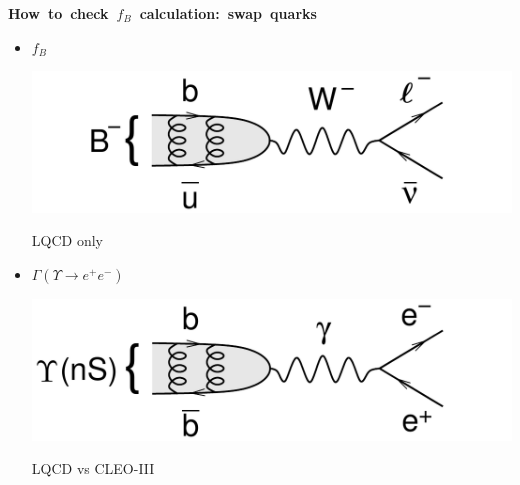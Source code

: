 \documentclass[landscape]{article}
\newenvironment{slide}[1][ ]{\mbox{\bf \boldmath #1 } \vfill}{\vfill \vspace{-1.5 cm} \mbox{ } \pagebreak}
\newenvironment{itemizer}[1]{\begin{itemize}\setlength{\itemsep}{#1}}{\end{itemize}}
\begin{document}
\begin{slide}[How to check $f_B$ calculation: swap quarks]

\begin{itemizer}{2 cm}

  \item \begin{minipage}{0.22\linewidth} $f_B$ \end{minipage} \hfill \begin{minipage}{11 cm} \includegraphics[width=\linewidth]{diagram_Btolnu} \end{minipage} \hfill \begin{minipage}{0.3\linewidth} \begin{center} LQCD only \end{center} \end{minipage}

  \item \begin{minipage}{0.22\linewidth} $\Gamma(\Upsilon \to e^+e^-)$ \end{minipage} \hfill \begin{minipage}{11 cm} \includegraphics[width=\linewidth]{diagram_GeeU} \end{minipage} \hfill \begin{minipage}{0.3\linewidth} \begin{center} LQCD vs CLEO-III \end{center} \end{minipage}


\end{itemizer}
\end{slide}
\end{document}
